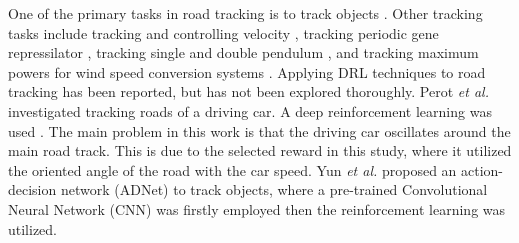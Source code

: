 \documentclass{svproc}
\begin{document}
	One of the primary tasks in road tracking is to track objects \cite{Grigore2000Reinforcement,Cohen2010Reinforcement,Liu2004Reinforcement,Supancic2017Tracking}. %
	Other tracking tasks include tracking and controlling velocity \cite{Jinlin2009Neurofuzzy}, tracking periodic gene repressilator \cite{Sootla2013On}, tracking single and double pendulum \cite{Hall2011Reinforcement}, and tracking maximum powers for wind speed conversion systems \cite{Wei2015Reinforcement}. 
	Applying DRL techniques to road tracking has been reported, but has not been explored thoroughly.  Perot \emph{et al.} investigated tracking roads of a driving car. A deep reinforcement learning was used 
	\cite{Perot2017End}. The main problem in this work is that the driving car oscillates around the main road track. This is due to the selected reward in this study, where it utilized the oriented angle of the road with the car speed. %
	Yun \textit{et al.} \cite{Yun2017Action,Yun2018Action} proposed an action-decision network (ADNet) to track objects, %
	where a pre-trained Convolutional Neural Network (CNN) was firstly employed then the reinforcement learning was utilized. 
\end{document}
